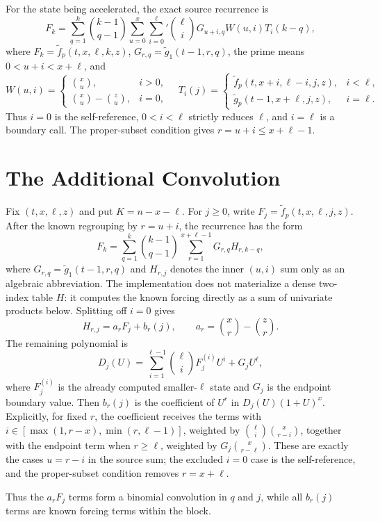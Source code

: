 \documentclass[10pt]{article}
\begin{document}
For the state being accelerated, the exact source recurrence is
\[
F_k=\sum_{q=1}^k\binom{k-1}{q-1}\sum_{u=0}^{x}\sum_{i=0}^{\ell}\!{}'\binom{\ell}{i}G_{u+i,q}W(u,i)T_i(k-q),
\]
where $F_k=\widetilde f_p(t,x,\ell,k,z)$, $G_{r,q}=\widetilde g_1(t-1,r,q)$, the prime means $0<u+i<x+\ell$, and
\[
W(u,i)=\begin{cases}\binom{x}{u},&i>0,\\\binom{x}{u}-\binom{z}{u},&i=0,\end{cases}\quad
T_i(j)=\begin{cases}\widetilde f_p(t,x+i,\ell-i,j,z),&i<\ell,\\\widetilde g_p(t-1,x+\ell,j,z),&i=\ell.\end{cases}
\]
Thus $i=0$ is the self-reference, $0<i<\ell$ strictly reduces $\ell$, and $i=\ell$ is a boundary call. The proper-subset condition gives $r=u+i\le x+\ell-1$.

\section{The Additional Convolution}
Fix $(t,x,\ell,z)$ and put $K=n-x-\ell$. For $j\ge0$, write $F_j=\widetilde f_p(t,x,\ell,j,z)$. After the known regrouping by $r=u+i$, the recurrence has the form
\[
 F_k=\sum_{q=1}^k\binom{k-1}{q-1}\sum_{r=1}^{x+\ell-1}G_{r,q}H_{r,k-q},
\]
where $G_{r,q}=\widetilde g_1(t-1,r,q)$ and $H_{r,j}$ denotes the inner $(u,i)$ sum only as an algebraic abbreviation. The implementation does not materialize a dense two-index table $H$: it computes the known forcing directly as a sum of univariate products below. Splitting off $i=0$ gives
\[
 H_{r,j}=a_rF_j+b_r(j),\qquad a_r=\binom{x}{r}-\binom{z}{r}.
\]
The remaining polynomial is
\[
D_j(U)=\sum_{i=1}^{\ell-1}\binom{\ell}{i}F^{(i)}_jU^i+G_jU^\ell,
\]
where $F^{(i)}_j$ is the already computed smaller-$\ell$ state and $G_j$ is the endpoint boundary value. Then $b_r(j)$ is the coefficient of $U^r$ in $D_j(U)(1+U)^x$. Explicitly, for fixed $r$, the coefficient receives the terms with $i\in[\max(1,r-x),\min(r,\ell-1)]$, weighted by $\binom{\ell}{i}\binom{x}{r-i}$, together with the endpoint term when $r\ge\ell$, weighted by $G_j\binom{x}{r-\ell}$. These are exactly the cases $u=r-i$ in the source sum; the excluded $i=0$ case is the self-reference, and the proper-subset condition removes $r=x+\ell$.

Thus the $a_rF_j$ terms form a binomial convolution in $q$ and $j$, while all $b_r(j)$ terms are known forcing terms within the block.
\end{document}
